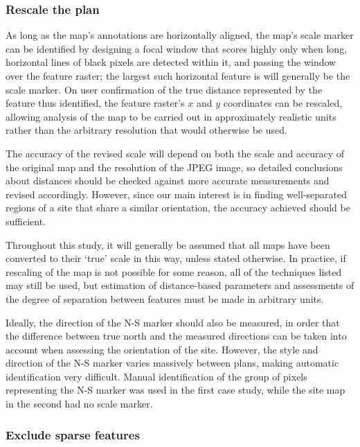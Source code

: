 \documentclass[../../ArchStats.tex]{subfiles}
\begin{document}
\subsubsection{Rescale the plan}
\label{sec:rescale}

As long as the map's annotations are horizontally aligned, the map's scale marker can be identified by designing a focal window that scores highly only when long, horizontal lines of black pixels are detected within it, and passing the window over the feature raster; the largest such horizontal feature is will generally be the scale marker. On user confirmation of the true distance represented by the feature thus identified, the feature raster's $x$ and $y$ coordinates can be rescaled, allowing analysis of the map to be carried out in approximately realistic units rather than the arbitrary resolution that would otherwise be used.

The accuracy of the revised scale will depend on both the scale and accuracy of the original map and the resolution of the JPEG image, so detailed conclusions about distances should be checked against more accurate measurements and revised accordingly. However, since our main interest is in finding well-separated regions of a site that share a similar orientation, the accuracy achieved should be sufficient.

Throughout this study, it will generally be assumed that all maps have been converted to their `true' scale in this way, unless stated otherwise. In practice, if rescaling of the map is not possible for some reason, all of the techniques listed may still be used, but estimation of distance-based parameters and assessments of the degree of separation between features must be made in arbitrary units.

Ideally, the direction of the N-S marker should also be measured, in order that the difference between true north and the measured directions can be taken into account when assessing the orientation of the site. However, the style and direction of the N-S marker varies massively between plans, making automatic identification very difficult. Manual identification of the group of pixels representing the N-S marker was used in the first case study, while the site map in the second had no scale marker.

\subsubsection{Exclude sparse features}
\label{sec:excl-sparse}
\end{document}
